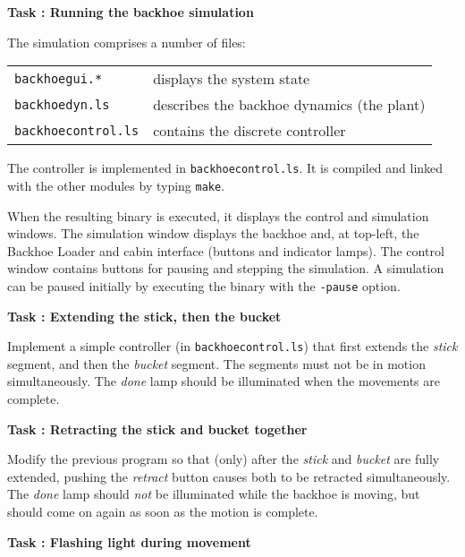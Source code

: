 \documentclass[12pt]{article}
\newcounter{task}
\newcommand{\nexttask}[1]{%
	\addtocounter{task}{1}%
	\textbf{\large{}Task \thetask: #1\ }\rule{0em}{4ex}}
\begin{document}
\nexttask{Running the backhoe simulation} %

The simulation comprises a number of files:

\begin{tabular}{ll}
    \texttt{backhoegui.*} &
        displays the system state \\

    \texttt{backhoedyn.ls} &
        describes the backhoe dynamics (the plant) \\

    \texttt{backhoecontrol.ls} &
        contains the discrete controller\\
\end{tabular}

\noindent
The controller is implemented in \texttt{backhoecontrol.ls}.
It is compiled and linked with the other modules by typing \verb+make+.

When the resulting binary is executed, it displays the control and 
simulation windows.
The simulation window displays the backhoe and, at top-left, the Backhoe 
Loader and cabin interface (buttons and indicator lamps).
The control window contains buttons for pausing and stepping the simulation.
A simulation can be paused initially by executing the binary with the 
\verb+-pause+ option.

\nexttask{Extending the stick, then the bucket} %

Implement a simple controller (in \texttt{backhoecontrol.ls}) that first 
extends the \emph{stick} segment, and then the \emph{bucket} segment.
The segments must not be in motion simultaneously.
The \emph{done} lamp should be illuminated when the movements are complete.

\nexttask{Retracting the stick and bucket together} %

Modify the previous program so that (only) after the \emph{stick} and 
\emph{bucket} are fully extended, pushing the \emph{retract} button causes 
both to be retracted simultaneously.
The \emph{done} lamp should \emph{not} be illuminated while the backhoe is 
moving, but should come on again as soon as the motion is complete.

\nexttask{Flashing light during movement} %
\end{document}
